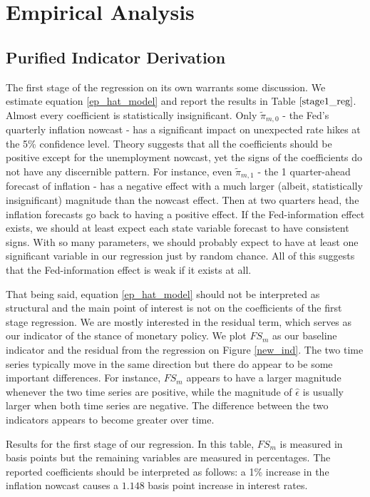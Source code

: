 \documentclass[a4paper,man,floatsintext,natbib]{apa6}
\begin{document}
	\section{Empirical Analysis}
	\subsection{Purified Indicator Derivation}
	The first stage of the regression on its own warrants some discussion. 	We estimate equation \ref{ep_hat_model} and report the results in Table \(\ref{stage1_reg}\). Almost every coefficient is statistically insignificant. Only \(\tilde{\pi}_{m,0}\) - the Fed's quarterly inflation nowcast - has a significant impact on unexpected rate hikes at the 5\% confidence level. Theory suggests that all the coefficients should be positive except for the unemployment nowcast, yet the signs of the coefficients do not have any discernible pattern. For instance, even \(\tilde{\pi}_{m,1}\) - the 1 quarter-ahead forecast of inflation - has a negative effect with a much larger (albeit, statistically insignificant) magnitude than the nowcast effect. Then at two quarters head, the inflation forecasts go back to having a positive effect. If the Fed-information effect exists, we should at least expect each state variable forecast to have consistent signs. With so many parameters, we should probably expect to have at least one significant variable in our regression just by random chance. All of this suggests that the Fed-information effect is weak if it exists at all. 

	That being said, equation \ref{ep_hat_model} should not be interpreted as structural and the main point of interest is not on the coefficients of the first stage regression. We are mostly interested in the residual term, which serves as our indicator of the stance of monetary policy. We plot \(FS_m\) as our baseline indicator and the residual from the regression on Figure \ref{new_ind}. The two time series typically move in the same direction but there do appear to be some important differences. For instance, \(FS_m\) appears to have a larger magnitude whenever the two time series are positive, while the magnitude of \(\hat{\epsilon}\) is usually larger when both time series are negative. The difference between the two indicators appears to become greater over time. 
	
	\begin{table}[H]
		\centering
		
		\caption{Results for the first stage of our regression. In this table, \(FS_m\) is measured in basis points but the remaining variables are measured in percentages. The reported coefficients should be interpreted as follows: a 1\% increase in the inflation nowcast causes a \(1.148\) basis point increase in interest rates.}
		\label{stage1_reg}
	\end{table}
	
\end{document}
